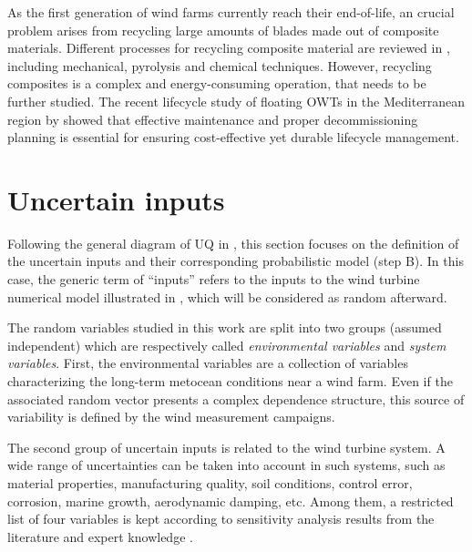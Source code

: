 As the first generation of wind farms currently reach their end-of-life, an crucial problem arises from recycling large amounts of blades made out of composite materials. 
Different processes for recycling composite material are reviewed in \citet{jensen_2018_blade_recycling}, including mechanical, pyrolysis and chemical techniques. 
However, recycling composites is a complex and energy-consuming operation, that needs to be further studied. 
The recent lifecycle study of floating OWTs in the Mediterranean region by \citet{pulselli_2022_FOWT_lifecycle} showed that effective maintenance and 
proper decommissioning planning is essential for ensuring cost-effective yet durable lifecycle management.  




\section{Uncertain inputs} \label{sec:owt_uncertainties}

Following the general diagram of UQ in , this section focuses on the definition of the uncertain inputs and their corresponding probabilistic model (step B). 
In this case, the generic term of ``inputs'' refers to the inputs to the wind turbine numerical model illustrated in , which will be considered as random afterward. 

The random variables studied in this work are split into two groups (assumed independent) which are respectively called \textit{environmental variables} and \textit{system variables}. 
First, the environmental variables are a collection of variables characterizing the long-term metocean conditions near a wind farm.
Even if the associated random vector presents a complex dependence structure, this source of variability is defined by the wind measurement campaigns. 

The second group of uncertain inputs is related to the wind turbine system. 
A wide range of uncertainties can be taken into account in such systems, such as material properties, manufacturing quality, soil conditions, control error, corrosion, marine growth, aerodynamic damping, etc.  
Among them, a restricted list of four variables is kept according to sensitivity analysis results from the literature and expert knowledge \citep{dimitrov_kelly_2018,teixeira_2019,verlade_kramhoft_2019,petrovska_2022}. 

